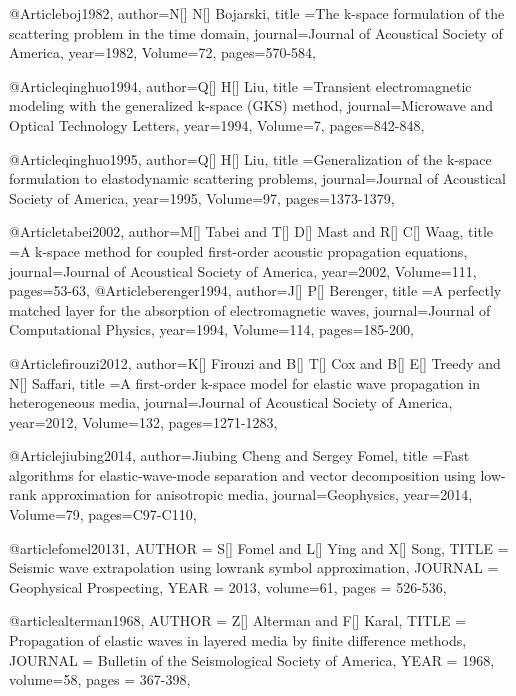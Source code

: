@Article{boj1982,
  author={N[] N[] Bojarski},
  title ={The k-space formulation of the scattering problem in the time domain},
  journal={Journal of Acoustical Society of America},
  year=1982,
  Volume=72,
  pages={570-584},
}


@Article{qinghuo1994,
  author={Q[] H[] Liu},
  title ={Transient electromagnetic modeling with the generalized k-space (GKS) method},
  journal={Microwave and Optical Technology Letters},
  year=1994,
  Volume=7,
  pages={842-848},
}

@Article{qinghuo1995,
  author={Q[] H[] Liu},
  title ={Generalization of the k-space formulation to elastodynamic scattering problems},
  journal={Journal of Acoustical Society of America},
  year=1995,
  Volume=97,
  pages={1373-1379},
}

@Article{tabei2002,
  author={M[] Tabei and T[] D[] Mast and R[] C[] Waag},
  title ={A k-space method for coupled first-order acoustic propagation equations},
  journal={Journal of Acoustical Society of America},
  year=2002,
  Volume=111,
  pages={53-63},
}
@Article{berenger1994,
  author={J[] P[] Berenger},
  title ={A perfectly matched layer for the absorption of electromagnetic waves},
  journal={Journal of Computational Physics},
  year=1994,
  Volume=114,
  pages={185-200},
}

@Article{firouzi2012,
  author={K[] Firouzi and B[] T[] Cox and B[] E[] Treedy and N[] Saffari},
  title ={A first-order k-space model for elastic wave propagation in heterogeneous media},
  journal={Journal of Acoustical Society of America},
  year=2012,
  Volume=132,
  pages={1271-1283},
}


@Article{jiubing2014,
  author={Jiubing Cheng and Sergey Fomel},
  title ={Fast algorithms for elastic-wave-mode separation and vector decomposition using low-rank approximation for anisotropic media},
  journal={Geophysics},
  year=2014,
  Volume=79,
  pages={C97-C110},
}

@article{fomel20131,
  AUTHOR =       {S[] Fomel and L[] Ying and X[] Song},
  TITLE =        {Seismic wave extrapolation using lowrank symbol approximation},
  JOURNAL =      {Geophysical Prospecting},
  YEAR =         {2013},
  volume=61,
  pages = {526-536},
}

@article{alterman1968,
  AUTHOR =       {Z[] Alterman and F[] Karal},
  TITLE =        {Propagation of elastic waves in layered media by finite difference methods},
  JOURNAL =      {Bulletin of the Seismological Society of America},
  YEAR =         {1968},
  volume=58,
  pages = {367-398},
}

